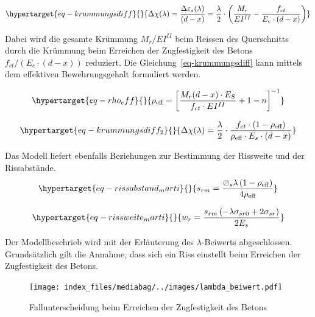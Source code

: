 \documentclass[
  12pt,
  letterpaper,
  egregdoesnotlikesansseriftitles]{scrreprt}
\begin{document}
\begin{equation}\protect\hypertarget{eq-krummungsdiff}{}{
\Delta \chi(\lambda) = \frac{\Delta \varepsilon_s (\lambda)}{(d-x)} = \frac{\lambda}{2} \cdot \left ( \frac{M_r}{EI^{II}} - \frac{f_{ct}}{E_c\cdot(d-x)}\right )
}\label{eq-krummungsdiff}\end{equation}

Dabei wird die gesamte Krümmung \(M_r/EI^{II}\) beim Reissen des
Querschnitts durch die Krümmung beim Erreichen der Zugfestigkeit des
Betons \(f_{ct}/(E_c\cdot(d-x))\) reduziert. Die
Gleichung~\ref{eq-krummungsdiff} kann mittels dem effektiven
Bewehrungsgehalt formuliert werden.

\begin{equation}\protect\hypertarget{eq-rho_eff}{}{
\rho_{\text{eff}} = \left [\frac{M_r(d-x)\cdot E_S}{f_{ct}\cdot EI^{II}}+1-n \right ]^{-1}
}\label{eq-rho_eff}\end{equation}

\begin{equation}\protect\hypertarget{eq-krummungsdiff_2}{}{
\Delta \chi(\lambda) = \frac{\lambda}{2} \cdot \frac{f_{ct} \cdot (1-\rho_{\text{eff}})}{\rho_{\text{eff}} \cdot E_s \cdot (d-x)}
}\label{eq-krummungsdiff_2}\end{equation}

Das Modell liefert ebenfalls Beziehungen zur Bestimmung der Rissweite
und der Rissabstände.
\begin{equation}\protect\hypertarget{eq-rissabstand_marti}{}{
s_{rm} = \frac{\oslash_{s} \lambda \left(1 - \rho_{\text{eff}}\right)}{4 \rho_{\text{eff}}}
}\label{eq-rissabstand_marti}\end{equation}

\begin{equation}\protect\hypertarget{eq-rissweite_marti}{}{
w_{r} = \frac{s_{rm} \left(- \lambda \sigma_{sr0} + 2 \sigma_{sr}\right)}{2 E_{s}}
}\label{eq-rissweite_marti}\end{equation}

Der Modellbeschrieb wird mit der Erläuterung des \(\lambda\)-Beiwerts
abgeschlossen. Grundsätzlich gilt die Annahme, dass sich ein Riss
einstellt beim Erreichen der Zugfestigkeit des Betons.

\begin{figure}[H]

{\centering \texttt{[image: index\_files/mediabag/../images/lambda\_beiwert.pdf]}

}

\caption{\label{fig-fallunterscheidung_lambda_riss}Fallunterscheidung
beim Erreichen der Zugfestigkeit des Betons}

\end{figure}
\end{document}
